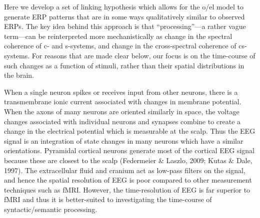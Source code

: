 Here we develop a set of linking hypothesis which allows for the o/el model to generate ERP patterns that are in some ways qualitatively similar to observed ERPs. The key idea behind this approach is that “processing”—a rather vague term—can be reinterpreted more mechanistically as change in the spectral coherence of c- and s-systems, and change in the cross-spectral coherence of cs-systems. For reasons that are made clear below, our focus is on the time-course of such changes as a function of stimuli, rather than their spatial distributions in the brain.

When a single neuron spikes or receives input from other neurons, there is a transmembrane ionic current associated with changes in membrane potential. When the axons of many neurons are oriented similarly in space, the voltage changes associated with individual neurons and synapses combine to create a change in the electrical potential which is measurable at the scalp. Thus the EEG signal is an integration of state changes in many neurons which have a similar orientations. Pyramidal cortical neurons generate most of the cortical EEG signal because these are closest to the scalp (Federmeier \& Laszlo, 2009; Kutas \& Dale, 1997). The extracellular fluid and cranium act as low-pass filters on the signal, and hence the spatial resolution of EEG is poor compared to other measurement techniques such as fMRI. However, the time-resolution of EEG is far superior to fMRI and thus it is better-suited to investigating the time-course of syntactic/semantic processing. 

